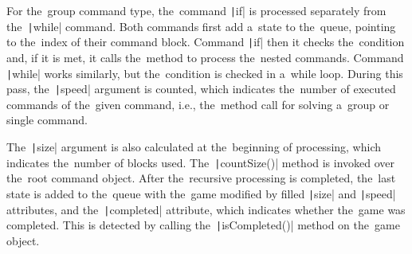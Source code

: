 For the~group command type, the~command \texttt|if| is processed separately from the~\texttt|while| command.
Both commands first add a~state to the~queue, pointing to the~index of their command block.
Command \texttt|if| then it checks the~condition and, if it is met, it calls the~method to process the~nested commands.
Command \texttt|while| works similarly, but the~condition is checked in a~while loop.
During this pass, the~\texttt|speed| argument is counted, which indicates the~number of executed commands of the~given command, i.e., the~method call for solving a~group or single command.

The~\texttt|size| argument is also calculated at the~beginning of processing, which indicates the~number of blocks used.
The~\texttt|countSize()| method is invoked over the~root command object.
After the~recursive processing is completed, the~last state is added to the~queue with the~game modified by filled \texttt|size| and \texttt|speed| attributes, and the~\texttt|completed| attribute, which indicates whether the~game was completed.
This is detected by calling the~\texttt|isCompleted()| method on the~game object.
